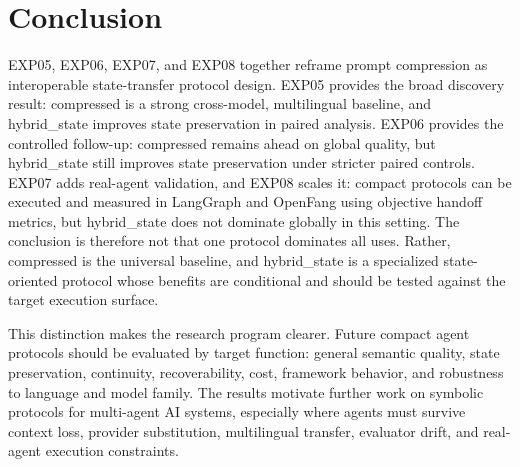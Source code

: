 \documentclass[11pt]{article}
\begin{document}
\section{Conclusion}
EXP05, EXP06, EXP07, and EXP08 together reframe prompt compression as interoperable state-transfer protocol design. EXP05 provides the broad discovery result: compressed is a strong cross-model, multilingual baseline, and hybrid\_state improves state preservation in paired analysis. EXP06 provides the controlled follow-up: compressed remains ahead on global quality, but hybrid\_state still improves state preservation under stricter paired controls. EXP07 adds real-agent validation, and EXP08 scales it: compact protocols can be executed and measured in LangGraph and OpenFang using objective handoff metrics, but hybrid\_state does not dominate globally in this setting. The conclusion is therefore not that one protocol dominates all uses. Rather, compressed is the universal baseline, and hybrid\_state is a specialized state-oriented protocol whose benefits are conditional and should be tested against the target execution surface.

This distinction makes the research program clearer. Future compact agent protocols should be evaluated by target function: general semantic quality, state preservation, continuity, recoverability, cost, framework behavior, and robustness to language and model family. The results motivate further work on symbolic protocols for multi-agent AI systems, especially where agents must survive context loss, provider substitution, multilingual transfer, evaluator drift, and real-agent execution constraints.
\end{document}
